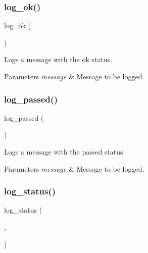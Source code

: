 \subsubsection{\texorpdfstring{log\+\_\+ok()}{log\_ok()}}
{\footnotesize\ttfamily log\+\_\+ok (\begin{DoxyParamCaption}\item[{message}]{ }\end{DoxyParamCaption})}



Logs a message with the \textquotesingle{}ok\textquotesingle{} status. 


\begin{DoxyParams}{Parameters}
{\em message} & Message to be logged. \\
\hline
\end{DoxyParams}
\mbox{\label{group__log_ga074798b609f0b5076100e00dc9ca8321}} 
\subsubsection{\texorpdfstring{log\+\_\+passed()}{log\_passed()}}
{\footnotesize\ttfamily log\+\_\+passed (\begin{DoxyParamCaption}\item[{message}]{ }\end{DoxyParamCaption})}



Logs a message with the \textquotesingle{}passed\textquotesingle{} status. 


\begin{DoxyParams}{Parameters}
{\em message} & Message to be logged. \\
\hline
\end{DoxyParams}
\mbox{\label{group__log_ga2a12f6f9378f17256075a29a706a58f5}} 
\subsubsection{\texorpdfstring{log\+\_\+status()}{log\_status()}}
{\footnotesize\ttfamily log\+\_\+status (\begin{DoxyParamCaption}\item[{message}]{,  }\item[{status}]{ }\end{DoxyParamCaption})}



